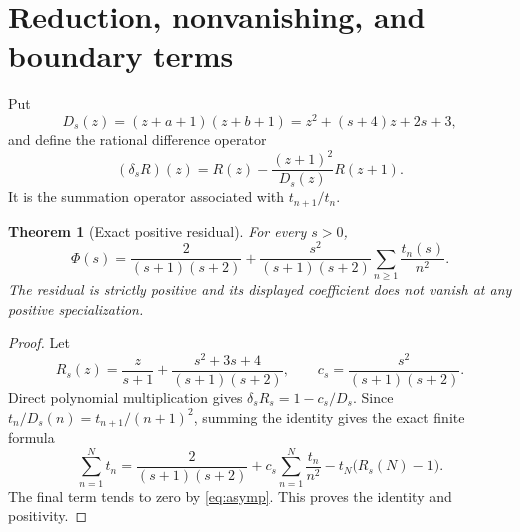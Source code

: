 \documentclass[11pt]{article}
\newtheorem{theorem}{Theorem}[section]
\theoremstyle{remark}
\begin{document}
\section{Reduction, nonvanishing, and boundary terms}

Put
\[
 D_s(z)=(z+a+1)(z+b+1)=z^2+(s+4)z+2s+3,
\]
and define the rational difference operator
\begin{equation}\label{eq:delta}
 (\delta_sR)(z)=R(z)-\frac{(z+1)^2}{D_s(z)}R(z+1).
\end{equation}
It is the summation operator associated with $t_{n+1}/t_n$.

\begin{theorem}[Exact positive residual]\label{thm:reduction}
For every $s>0$,
\begin{equation}\label{eq:reduction}
 \boxed{\displaystyle
 \Phi(s)=\frac{2}{(s+1)(s+2)}+
 \frac{s^2}{(s+1)(s+2)}\sum_{n\ge1}\frac{t_n(s)}{n^2}.}
\end{equation}
The residual is strictly positive and its displayed coefficient does
not vanish at any positive specialization.
\end{theorem}
\begin{proof}
Let
\[
 R_s(z)=\frac{z}{s+1}+\frac{s^2+3s+4}{(s+1)(s+2)},
 \qquad c_s=\frac{s^2}{(s+1)(s+2)}.
\]
Direct polynomial multiplication gives
$\delta_sR_s=1-c_s/D_s$. Since
$t_n/D_s(n)=t_{n+1}/(n+1)^2$, summing the identity gives the exact finite
formula
\begin{equation}\label{eq:finite-boundary}
 \sum_{n=1}^N t_n
 =\frac{2}{(s+1)(s+2)}+c_s\sum_{n=1}^N\frac{t_n}{n^2}
  -t_N\bigl(R_s(N)-1\bigr).
\end{equation}
The final term tends to zero by \eqref{eq:asymp}. This proves the
identity and positivity.
\end{proof}
\end{document}
